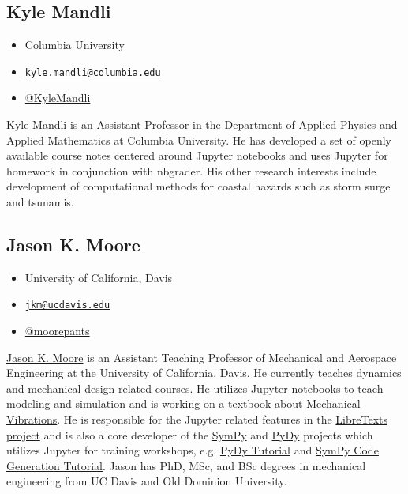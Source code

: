 \documentclass[]{book}
\providecommand{\tightlist}{%
  \setlength{\itemsep}{0pt}\setlength{\parskip}{0pt}}
\begin{document}
\subsection*{Kyle Mandli}\label{kyle-mandli}

\begin{itemize}
\tightlist
\item
  Columbia University
\item
  \href{mailto:kyle.mandli@columbia.edu}{\nolinkurl{kyle.mandli@columbia.edu}}
\item
  \href{https://twitter.com/KyleMandli}{@KyleMandli}
\end{itemize}

\href{http://www.columbia.edu/~ktm2132/}{Kyle Mandli} is an Assistant
Professor in the Department of Applied Physics and Applied Mathematics
at Columbia University. He has developed a set of openly available
course notes centered around Jupyter notebooks and uses Jupyter for
homework in conjunction with nbgrader. His other research interests
include development of computational methods for coastal hazards such as
storm surge and tsunamis.

\subsection*{Jason K. Moore}\label{jason-k.-moore}

\begin{itemize}
\tightlist
\item
  University of California, Davis
\item
  \href{mailto:jkm@ucdavis.edu}{\nolinkurl{jkm@ucdavis.edu}}
\item
  \href{https://twitter.com/moorepants}{@moorepants}
\end{itemize}

\href{http://moorepants.info/}{Jason K. Moore} is an Assistant Teaching
Professor of Mechanical and Aerospace Engineering at the University of
California, Davis. He currently teaches dynamics and mechanical design
related courses. He utilizes Jupyter notebooks to teach modeling and
simulation and is working on a
\href{https://moorepants.github.io/resonance}{textbook about Mechanical
Vibrations}. He is responsible for the Jupyter related features in the
\href{http://libretexts.org}{LibreTexts project} and is also a core
developer of the \href{http://sympy.org/}{SymPy} and
\href{http://pydy.org/}{PyDy} projects which utilizes Jupyter for
training workshops, e.g.
\href{https://www.sympy.org/scipy-2017-codegen-tutorial/}{PyDy Tutorial}
and \href{https://github.com/pydy/pydy-tutorial-human-standing}{SymPy
Code Generation Tutorial}. Jason has PhD, MSc, and BSc degrees in
mechanical engineering from UC Davis and Old Dominion University.
\end{document}

